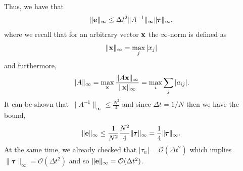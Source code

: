 Thus, we have that 
\begin{equation*}
    \| \mathbf{e} \|_\infty \le \Delta t^2 \| A^{-1} \|_\infty \| \pmb{\tau}\|_\infty,
\end{equation*}
where we recall that for an arbitrary vector $\mathbf{x}$ the $\infty$-norm 
is defined as 
\begin{equation*}
    \| \mathbf{x}\|_{\infty} = \max_{j} |x_j|
\end{equation*}
and furthermore, 
\begin{equation*}
    \| A \|_{\infty} = \max_{\mathbf{x}} \frac{\| A \mathbf{x} \|_{\infty}}{\| \mathbf{x} \|_{\infty}}
    = \max_{i} \sum_{j} |a_{ij}|.
\end{equation*}
It can be shown that $\| A^{-1} \|_\infty \le \frac{N^2}{4}$ 
and since $\Delta t = 1/N$ then we have the bound, 
\begin{equation*}
    \| \mathbf{e} \|_\infty \le 
     \frac{1}{N^2}\frac{N^2}{4} \| \pmb \tau \|_\infty
     = \frac{1}{4} \| \pmb \tau \|_\infty.
\end{equation*}
At the same time, we already checked that 
$|\tau_n| = \mathcal{O}(\Delta t^2)$ which implies 
$\| \pmb \tau \|_\infty = \mathcal{O}(\Delta t^2)$ 
and so $\| \mathbf{e} \|_\infty = \mathcal{O}(\Delta t^2)$.
% 
% 




% 
% 
